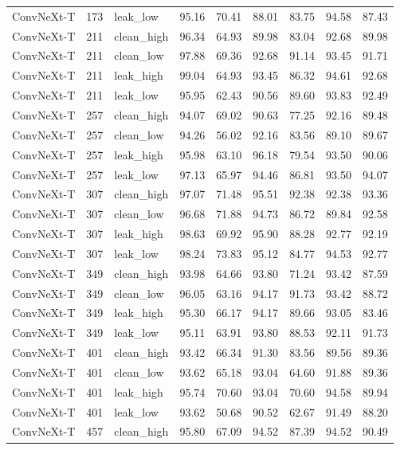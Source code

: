 {\begin{longtable}{lrlrrrrrr}
ConvNeXt-T & 173 & leak\_low & 95.16 & 70.41 & 88.01 & 83.75 & 94.58 & 87.43 \\
ConvNeXt-T & 211 & clean\_high & 96.34 & 64.93 & 89.98 & 83.04 & 92.68 & 89.98 \\
ConvNeXt-T & 211 & clean\_low & 97.88 & 69.36 & 92.68 & 91.14 & 93.45 & 91.71 \\
ConvNeXt-T & 211 & leak\_high & 99.04 & 64.93 & 93.45 & 86.32 & 94.61 & 92.68 \\
ConvNeXt-T & 211 & leak\_low & 95.95 & 62.43 & 90.56 & 89.60 & 93.83 & 92.49 \\
ConvNeXt-T & 257 & clean\_high & 94.07 & 69.02 & 90.63 & 77.25 & 92.16 & 89.48 \\
ConvNeXt-T & 257 & clean\_low & 94.26 & 56.02 & 92.16 & 83.56 & 89.10 & 89.67 \\
ConvNeXt-T & 257 & leak\_high & 95.98 & 63.10 & 96.18 & 79.54 & 93.50 & 90.06 \\
ConvNeXt-T & 257 & leak\_low & 97.13 & 65.97 & 94.46 & 86.81 & 93.50 & 94.07 \\
ConvNeXt-T & 307 & clean\_high & 97.07 & 71.48 & 95.51 & 92.38 & 92.38 & 93.36 \\
ConvNeXt-T & 307 & clean\_low & 96.68 & 71.88 & 94.73 & 86.72 & 89.84 & 92.58 \\
ConvNeXt-T & 307 & leak\_high & 98.63 & 69.92 & 95.90 & 88.28 & 92.77 & 92.19 \\
ConvNeXt-T & 307 & leak\_low & 98.24 & 73.83 & 95.12 & 84.77 & 94.53 & 92.77 \\
ConvNeXt-T & 349 & clean\_high & 93.98 & 64.66 & 93.80 & 71.24 & 93.42 & 87.59 \\
ConvNeXt-T & 349 & clean\_low & 96.05 & 63.16 & 94.17 & 91.73 & 93.42 & 88.72 \\
ConvNeXt-T & 349 & leak\_high & 95.30 & 66.17 & 94.17 & 89.66 & 93.05 & 83.46 \\
ConvNeXt-T & 349 & leak\_low & 95.11 & 63.91 & 93.80 & 88.53 & 92.11 & 91.73 \\
ConvNeXt-T & 401 & clean\_high & 93.42 & 66.34 & 91.30 & 83.56 & 89.56 & 89.36 \\
ConvNeXt-T & 401 & clean\_low & 93.62 & 65.18 & 93.04 & 64.60 & 91.88 & 89.36 \\
ConvNeXt-T & 401 & leak\_high & 95.74 & 70.60 & 93.04 & 70.60 & 94.58 & 89.94 \\
ConvNeXt-T & 401 & leak\_low & 93.62 & 50.68 & 90.52 & 62.67 & 91.49 & 88.20 \\
ConvNeXt-T & 457 & clean\_high & 95.80 & 67.09 & 94.52 & 87.39 & 94.52 & 90.49 \\

\end{longtable}}
